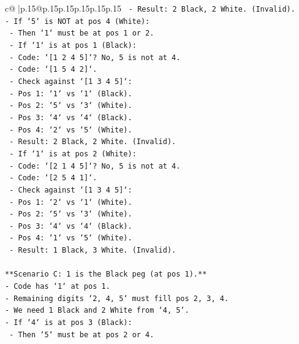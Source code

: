 \documentclass{article}
\begin{document}
{\begin{supertabular}{c@{$\;$}|p{.15\linewidth}@{}p{.15\linewidth}p{.15\linewidth}p{.15\linewidth}p{.15\linewidth}p{.15\linewidth}}
{{{\texttt{            {-} Result: 2 Black, 2 White. (Invalid).} \\
\texttt{{-} If `5` is NOT at pos 4 (White):} \\
\texttt{    {-} Then `1` must be at pos 1 or 2.} \\
\texttt{    {-} If `1` is at pos 1 (Black):} \\
\texttt{        {-} Code: `{[}1 2 4 5{]}`? No, 5 is not at 4.} \\
\texttt{        {-} Code: `{[}1 5 4 2{]}`.} \\
\texttt{        {-} Check against `{[}1 3 4 5{]}`:} \\
\texttt{            {-} Pos 1: `1` vs `1` (Black).} \\
\texttt{            {-} Pos 2: `5` vs `3` (White).} \\
\texttt{            {-} Pos 3: `4` vs `4` (Black).} \\
\texttt{            {-} Pos 4: `2` vs `5` (White).} \\
\texttt{            {-} Result: 2 Black, 2 White. (Invalid).} \\
\texttt{    {-} If `1` is at pos 2 (White):} \\
\texttt{        {-} Code: `{[}2 1 4 5{]}`? No, 5 is not at 4.} \\
\texttt{        {-} Code: `{[}2 5 4 1{]}`.} \\
\texttt{        {-} Check against `{[}1 3 4 5{]}`:} \\
\texttt{            {-} Pos 1: `2` vs `1` (White).} \\
\texttt{            {-} Pos 2: `5` vs `3` (White).} \\
\texttt{            {-} Pos 3: `4` vs `4` (Black).} \\
\texttt{            {-} Pos 4: `1` vs `5` (White).} \\
\texttt{            {-} Result: 1 Black, 3 White. (Invalid).} \\
\\ 
\texttt{**Scenario C: 1 is the Black peg (at pos 1).**} \\
\texttt{{-} Code has `1` at pos 1.} \\
\texttt{{-} Remaining digits `2, 4, 5` must fill pos 2, 3, 4.} \\
\texttt{{-} We need 1 Black and 2 White from `4, 5`.} \\
\texttt{{-} If `4` is at pos 3 (Black):} \\
\texttt{    {-} Then `5` must be at pos 2 or 4.} \\
}}}
\end{supertabular}}
\end{document}
